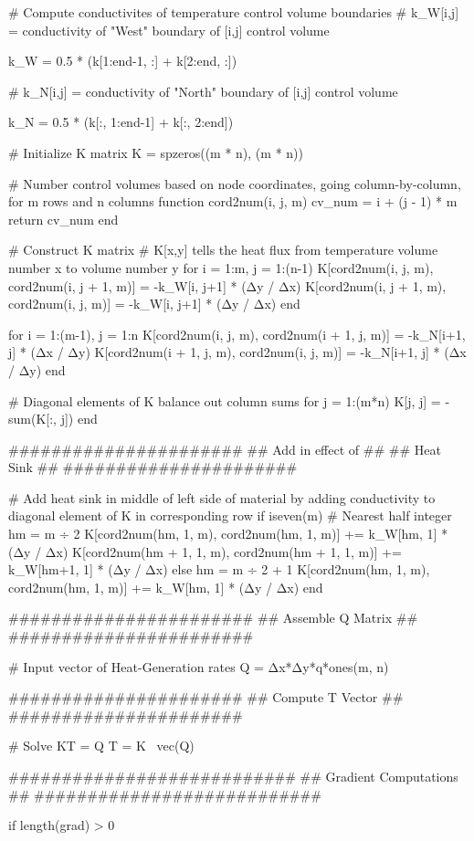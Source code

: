 \begin{jllisting}
	# Compute conductivites of temperature control volume boundaries
	# k_W[i,j] = conductivity of "West" boundary of [i,j] control volume

		k_W = 0.5 * (k[1:end-1, :] + k[2:end, :])
	
	# k_N[i,j] = conductivity of "North" boundary of [i,j] control volume
	
	k_N = 0.5 * (k[:, 1:end-1] + k[:, 2:end])
	
	# Initialize K matrix
	K = spzeros((m * n), (m * n))
	
	# Number control volumes based on node coordinates, going column-by-column, for m rows and n columns
	function cord2num(i, j, m)
	cv_num = i + (j - 1) * m
	return cv_num
	end
	
	# Construct K matrix
	# K[x,y] tells the heat flux from temperature volume number x to volume number y
	for i = 1:m, j = 1:(n-1)
	K[cord2num(i, j, m), cord2num(i, j + 1, m)] = -k_W[i, j+1] * (Δy / Δx)
	K[cord2num(i, j + 1, m), cord2num(i, j, m)] = -k_W[i, j+1] * (Δy / Δx)
	end
	
	for i = 1:(m-1), j = 1:n
	K[cord2num(i, j, m), cord2num(i + 1, j, m)] = -k_N[i+1, j] * (Δx / Δy)
	K[cord2num(i + 1, j, m), cord2num(i, j, m)] = -k_N[i+1, j] * (Δx / Δy)
	end
	
	# Diagonal elements of K balance out column sums
	for j = 1:(m*n)
	K[j, j] = -sum(K[:, j])
	end
	
	######################
	## Add in effect of ##
	##    Heat Sink     ##
	######################
	
	# Add heat sink in middle of left side of material by adding conductivity to diagonal element of K in corresponding row
	if iseven(m)
	# Nearest half integer
	hm = m ÷ 2
	K[cord2num(hm, 1, m), cord2num(hm, 1, m)] += k_W[hm, 1] * (Δy / Δx)
	K[cord2num(hm + 1, 1, m), cord2num(hm + 1, 1, m)] += k_W[hm+1, 1] * (Δy / Δx)
	else
	hm = m ÷ 2 + 1
	K[cord2num(hm, 1, m), cord2num(hm, 1, m)] += k_W[hm, 1] * (Δy / Δx)
	end
	
	#######################
	## Assemble Q Matrix ##
	#######################
	
	# Input vector of Heat-Generation rates
	Q = Δx*Δy*q*ones(m, n)

	######################
	## Compute T Vector ##
	######################
	
	# Solve KT = Q
	T = K \ vec(Q)
	
	###########################
	## Gradient Computations ##
	###########################
	
	if length(grad) > 0


\end{jllisting}
